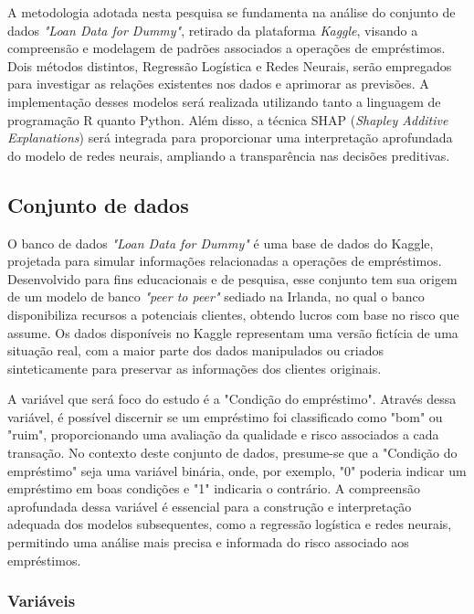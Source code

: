 A metodologia adotada nesta pesquisa se fundamenta na análise do conjunto de dados \textit{"Loan Data for Dummy"},
retirado da plataforma \textit{Kaggle},
visando a compreensão e modelagem de padrões associados a operações de empréstimos. Dois métodos distintos, 
Regressão Logística e Redes Neurais, serão empregados para investigar as relações existentes nos dados e aprimorar as previsões.
A implementação desses modelos será realizada utilizando tanto a linguagem de programação R quanto Python.
Além disso, a técnica SHAP (\textit{Shapley Additive Explanations}) será integrada para proporcionar
uma interpretação aprofundada do modelo de redes neurais, ampliando a transparência nas decisões preditivas. 



\subsection{Conjunto de dados}

O banco de dados \textit{"Loan Data for Dummy"} é uma base de dados do Kaggle, projetada para simular informações relacionadas 
a operações de empréstimos. Desenvolvido para fins educacionais e de pesquisa, esse conjunto tem sua origem de um modelo de 
banco \textit{"peer to peer"} sediado na Irlanda, no qual o banco disponibiliza recursos a potenciais clientes, 
obtendo lucros com base no risco que assume. 
Os dados disponíveis no Kaggle representam uma versão fictícia de uma situação real, com a maior parte dos dados manipulados
ou criados sinteticamente para preservar as informações dos clientes originais.

A variável que será foco do estudo é a "Condição do empréstimo". Através dessa variável, é 
possível discernir se um empréstimo foi classificado como "bom" ou "ruim", proporcionando uma avaliação da qualidade e 
risco associados a cada transação. No contexto deste conjunto de dados, presume-se que a "Condição do empréstimo" seja uma variável binária,
onde, por exemplo, "0" poderia indicar um empréstimo em boas condições e "1" indicaria o contrário.
A compreensão aprofundada dessa variável é essencial para a construção e interpretação adequada dos modelos subsequentes, 
como a regressão logística e redes neurais, permitindo uma análise mais precisa e informada do risco associado aos empréstimos.

\subsubsection{Variáveis}

